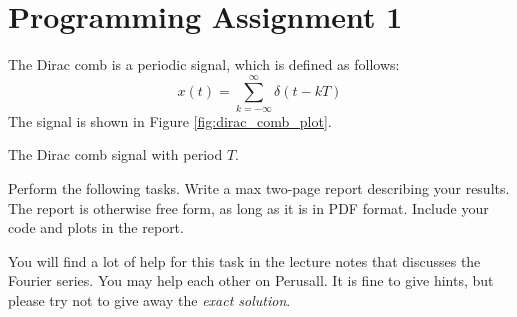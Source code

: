 \chapter{Programming Assignment 1}

The Dirac comb is a periodic signal, which is defined as follows:
\begin{equation}
x(t) = \sum_{k=-\infty}^{\infty} \delta(t - k T)
\end{equation}
The signal is shown in Figure \ref{fig:dirac_comb_plot}.

\begin{marginfigure}
\begin{center}
\end{center}
\caption{The Dirac comb signal with period $T$.}
\label{fig:dirac_comb_plot}
\end{marginfigure}

Perform the following tasks. Write a max two-page report describing
your results. The report is otherwise free form, as long as it is in
PDF format. Include your code and plots in the report.

You will find a lot of help for this task in the lecture notes that
discusses the Fourier series. You may help each other on Perusall. It
is fine to give hints, but please try not to give away the \emph{exact
  solution}.

